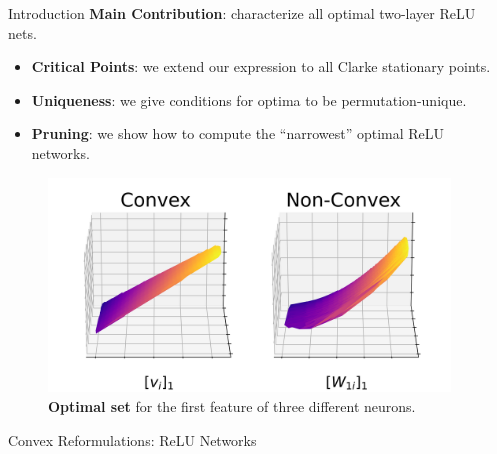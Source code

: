 \documentclass[12pt, usenames, dvipsnames]{beamer}
\newlength{\sepwidth}
\newlength{\colwidth}
\newcommand{\separatorcolumn}{\begin{column}{\sepwidth}\end{column}}
\newcommand{\blue}[1]{\textcolor{CBBlue}{#1}}
\begin{document}
\begin{frame}[t]
	\begin{columns}[t]
		\separatorcolumn

		\begin{column}{\colwidth}
			\vspace{-1.5em}
			\begin{block}{Introduction}
				\large
				{
					\Large
					\blue{\textbf{Main Contribution}}: characterize all optimal two-layer ReLU nets.
				}

				\begin{itemize}
					\item \textbf{Critical Points}: we extend our expression to all Clarke stationary points.

					\item \textbf{Uniqueness}: we give conditions for optima to be permutation-unique.

					\item \textbf{Pruning}: we show how to compute the ``narrowest'' optimal ReLU networks.
				\end{itemize}

				\vspace{-1em}

				\begin{figure}[]
					\centering
					\includegraphics[width=.9\textwidth]{assets/solution_sets_vis_270.png}
					\caption{\textbf{Optimal set} for the first feature of three different
						neurons.}
					\vspace{-1em}
					\label{fig:solution-sets}
				\end{figure}

			\end{block}

			\begin{block}{Convex Reformulations: ReLU Networks}

				\begin{columns}[t]
					\begin{column}{0.62\textwidth}


\end{column}
\end{columns}
\end{block}
\end{column}
\end{columns}
\end{frame}
\end{document}
